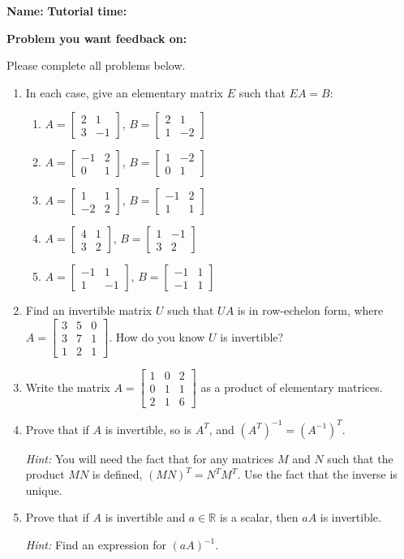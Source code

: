 \documentclass[12pt]{article}
\newcommand{\R}{\mathbb{R}}
\newcommand{\bbm}{\begin{bmatrix}}
\newcommand{\ebm}{\end{bmatrix}}
\begin{document}
{\bf \large Name:} \hspace{2.5in} {\bf Tutorial time:}

\bigskip

{\bf Problem you want feedback on:}

\bigskip

\thispagestyle{fancy}
Please complete all problems below.
 \begin{enumerate}
 \item In each case, give an elementary matrix $E$ such that $EA=B$:
\begin{enumerate}
 \item $A=\bbm 2&1\\3&-1\ebm$, $B = \bbm 2&1\\1&-2\ebm$
 \item $A=\bbm -1&2\\0&1\ebm$, $B = \bbm 1&-2\\0&1\ebm$
 \item $A=\bbm 1&1\\-2&2\ebm$, $B = \bbm -1&2\\1&1\ebm$
 \item $A=\bbm 4&1\\3&2\ebm$, $B = \bbm 1&-1\\ 3&2\ebm$
 \item $A=\bbm -1&1\\1&-1\ebm$, $B=\bbm -1&1\\-1&1\ebm$
\end{enumerate}
 
\item Find an invertible matrix $U$ such that $UA$ is in row-echelon form, where $A = \bbm 3&5&0\\3&7&1\\1&2&1\ebm$. How do you know $U$ is invertible?

\newpage

\item Write the matrix $A = \bbm 1&0&2\\0&1&1\\2&1&6\ebm$ as a product of elementary matrices.

\vspace{4in}


\item Prove that if $A$ is invertible, so is $A^T$, and $(A^T)^{-1} = (A^{-1})^T$.

{\em Hint:} You will need the fact that for any matrices $M$ and $N$ such that the product $MN$ is defined, $(MN)^T = N^TM^T$. Use the fact that the inverse is unique.

\vspace{2in}

\item Prove that if $A$ is invertible and $a\in\R$ is a scalar, then $aA$ is invertible.

{\em Hint:} Find an expression for $(aA)^{-1}$.


 \end{enumerate}
\end{document}

